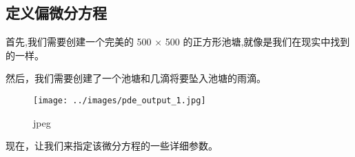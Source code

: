 \subsection{定义偏微分方程
}\label{ux5b9aux4e49ux504fux5faeux5206ux65b9ux7a0b}

首先,我们需要创建一个完美的 500 × 500
的正方形池塘,就像是我们在现实中找到的一样。

\begin{Shaded}
\begin{Highlighting}[]
\OperatorTok{=} 
\end{Highlighting}
\end{Shaded}

然后，我们需要创建了一个池塘和几滴将要坠入池塘的雨滴。

\begin{Shaded}
\begin{Highlighting}[]

\OperatorTok{=} \OperatorTok{=}\NormalTok{)}
\OperatorTok{=} \OperatorTok{=}\NormalTok{)}

  \NormalTok{(}\NormalTok{):}
  \OperatorTok{=} \NormalTok{)}
  \OperatorTok{=} 

\OperatorTok{=}\NormalTok{[}\OperatorTok{-}\NormalTok{, }\NormalTok{])}
\end{Highlighting}
\end{Shaded}

\begin{figure}[htbp]
\centering
\texttt{[image: ../images/pde\_output\_1.jpg]}
\caption{jpeg}
\end{figure}

现在，让我们来指定该微分方程的一些详细参数。

